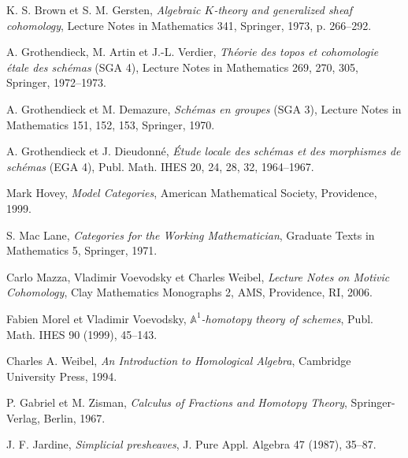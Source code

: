 \documentclass[11pt]{article}
\newcommand{\Aone}{\mathbb A^1}
\theoremstyle{deligne}
\begin{document}
\begin{enumerate}[label={[\arabic*]}]
\item K. S. Brown et S. M. Gersten, \emph{Algebraic \(K\)-theory and generalized sheaf cohomology}, Lecture Notes in Mathematics 341, Springer, 1973, p. 266--292.
\item A. Grothendieck, M. Artin et J.-L. Verdier, \emph{Théorie des topos et cohomologie étale des schémas} (SGA 4), Lecture Notes in Mathematics 269, 270, 305, Springer, 1972--1973.
\item A. Grothendieck et M. Demazure, \emph{Schémas en groupes} (SGA 3), Lecture Notes in Mathematics 151, 152, 153, Springer, 1970.
\item A. Grothendieck et J. Dieudonné, \emph{Étude locale des schémas et des morphismes de schémas} (EGA 4), Publ. Math. IHES 20, 24, 28, 32, 1964--1967.
\item Mark Hovey, \emph{Model Categories}, American Mathematical Society, Providence, 1999.
\item S. Mac Lane, \emph{Categories for the Working Mathematician}, Graduate Texts in Mathematics 5, Springer, 1971.
\item Carlo Mazza, Vladimir Voevodsky et Charles Weibel, \emph{Lecture Notes on Motivic Cohomology}, Clay Mathematics Monographs 2, AMS, Providence, RI, 2006.
\item Fabien Morel et Vladimir Voevodsky, \emph{\(\Aone\)-homotopy theory of schemes}, Publ. Math. IHES 90 (1999), 45--143.
\item Charles A. Weibel, \emph{An Introduction to Homological Algebra}, Cambridge University Press, 1994.
\item P. Gabriel et M. Zisman, \emph{Calculus of Fractions and Homotopy Theory}, Springer-Verlag, Berlin, 1967.
\item J. F. Jardine, \emph{Simplicial presheaves}, J. Pure Appl. Algebra 47 (1987), 35--87.
\end{enumerate}
\end{document}
